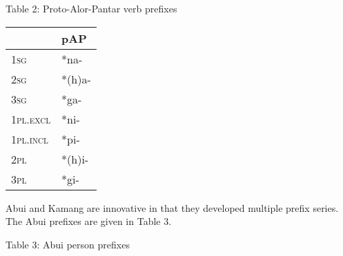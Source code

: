 Table 2: Proto-Alor-Pantar verb prefixes

\begin{flushleft}
\tablehead{}
\begin{supertabular}{|m{0.9038598in}|m{0.60455984in}|}
\hline
 &
pAP\\\hline
\scshape 1sg &
*na- \\\hline
\scshape 2sg &
*(h)a- \\\hline
\scshape 3sg &
*ga- \\\hline
\scshape 1pl.excl &
*ni- \\\hline
\scshape 1pl.incl &
*pi- \\\hline
\scshape 2pl &
*(h)i- \\\hline
\scshape 3pl &
*gi- \\\hline
\end{supertabular}
\end{flushleft}
Abui and Kamang are innovative in that they developed multiple prefix series. The Abui prefixes are given in Table 3.

Table 3: Abui person prefixes

